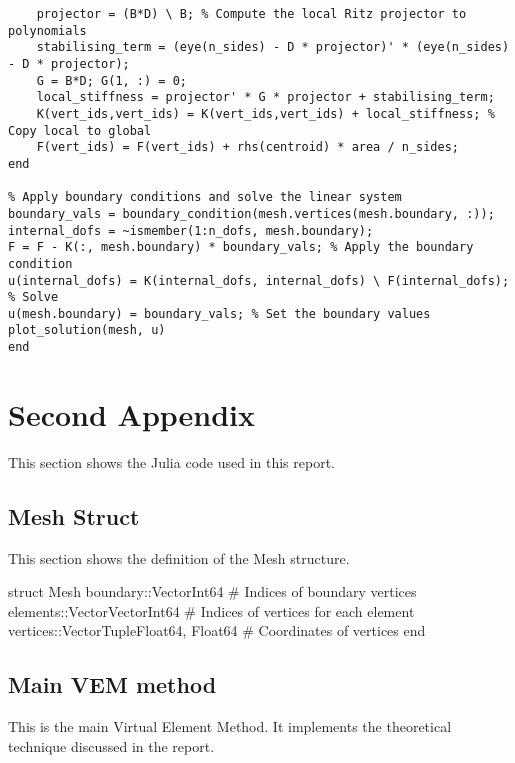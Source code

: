 \begin{lstlisting}[style=MatlabStyle]
    % Assemble the global stiffness matrix and forcing vector
    projector = (B*D) \ B; % Compute the local Ritz projector to polynomials
    stabilising_term = (eye(n_sides) - D * projector)' * (eye(n_sides) - D * projector);
    G = B*D; G(1, :) = 0;
    local_stiffness = projector' * G * projector + stabilising_term;
    K(vert_ids,vert_ids) = K(vert_ids,vert_ids) + local_stiffness; % Copy local to global
    F(vert_ids) = F(vert_ids) + rhs(centroid) * area / n_sides;
end

% Apply boundary conditions and solve the linear system
boundary_vals = boundary_condition(mesh.vertices(mesh.boundary, :));
internal_dofs = ~ismember(1:n_dofs, mesh.boundary);
F = F - K(:, mesh.boundary) * boundary_vals; % Apply the boundary condition
u(internal_dofs) = K(internal_dofs, internal_dofs) \ F(internal_dofs); % Solve
u(mesh.boundary) = boundary_vals; % Set the boundary values
plot_solution(mesh, u)
end
\end{lstlisting}

\section{Second Appendix}
This section shows the Julia code used in this report. 

\subsection{Mesh Struct}
This section shows the definition of the Mesh structure.


\begin{jllisting}[style=JuliaStyle]
struct Mesh
    boundary::Vector{Int64}    # Indices of boundary vertices
    elements::Vector{Vector{Int64}}  # Indices of vertices for each element
    vertices::Vector{Tuple{Float64, Float64}}  # Coordinates of vertices
end
\end{jllisting}

\subsection{Main VEM method}
This is the main Virtual Element Method. It implements the theoretical technique discussed in the report.

